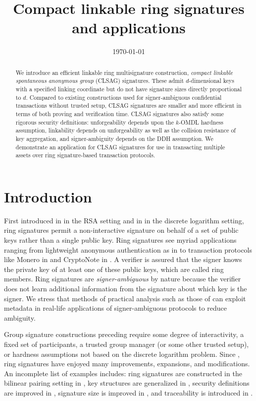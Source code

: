 \documentclass{mrl}
\title{Compact linkable ring signatures and applications}
\date{\today}
\theoremstyle{plain}
\theoremstyle{definition}
\begin{document}
\begin{abstract}
We introduce an efficient linkable ring multisignature construction, \textit{compact linkable spontaneous anonymous group} (CLSAG) signatures. These admit $d$-dimensional keys with a specified linking coordinate but do not have signature sizes directly proportional to $d$. Compared to existing constructions used for signer-ambiguous confidential transactions without trusted setup, CLSAG signatures are smaller and more efficient in terms of both proving and verification time. CLSAG signatures also satisfy some rigorous security definitions: unforgeability depends upon the $k$-OMDL hardness assumption, linkability depends on unforgeability as well as the collision resistance of key aggregation, and signer-ambiguity depends on the DDH assumption. We demonstrate an application for CLSAG signatures for use in transacting multiple assets over ring signature-based transaction protocols.
\end{abstract}


\section{Introduction}
First introduced in \cite{rivest} in the RSA setting and in \cite{liu} in the discrete logarithm setting, ring signatures permit a non-interactive signature on behalf of a set of public keys rather than a single public key. Ring signatures see myriad applications ranging from lightweight anonymous authentication as in \cite{yang2015lightweight} to transaction protocols like Monero in \cite{noether} and CryptoNote in \cite{van2013cryptonote}. A verifier is assured that the signer knows the private key of at least one of these public keys, which are called ring members. Ring signatures are \textit{signer-ambiguous} by nature because the verifier does not learn additional information from the signature about which key is the signer. We stress that methods of practical analysis such as those of  \cite{moser2018empirical,quesnelle2017linkability} can exploit metadata in real-life applications of signer-ambiguous protocols to reduce ambiguity. 

Group signature constructions preceding \cite{rivest,liu} require some degree of interactivity, a fixed set of participants, a trusted group manager (or some other trusted setup), or hardness assumptions not based on the discrete logarithm problem. Since \cite{rivest}, ring signatures have enjoyed many improvements, expansions, and modifications. An incomplete list of examples includes: ring signatures are constructed in the bilinear pairing setting in \cite{zhang2002id}, key structures are generalized in \cite{abe20021}, security definitions are improved in \cite{bender}, signature size is improved in \cite{fujisaki2011sub,gu2018constant}, and traceability is introduced in \cite{fujisaki2007traceable}.
\end{document}
